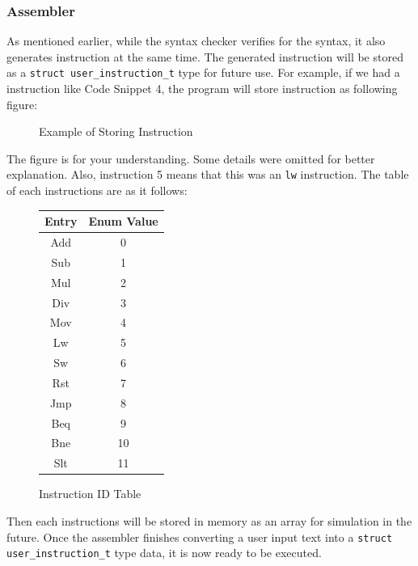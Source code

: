 \documentclass{homework}
\begin{document}
\subsubsection{Assembler}
As mentioned earlier, while the syntax checker verifies for the syntax, it also generates instruction at the same time. The generated instruction will be stored as a \texttt{struct user_instruction_t} type for future use. For example, if we had a instruction like Code Snippet 4, the program will store instruction as following figure:

\begin{figure}[h]
  \centering
  
  \caption{Example of Storing Instruction}
\end{figure}

The figure is for your understanding. Some details were omitted for better explanation. Also, instruction 5 means that this was an \texttt{lw} instruction. The table of each instructions are as it follows:

\begin{figure}[h]
\centering
\begin{tabular}{ |c|c| }
  \hline
  Entry & Enum Value \\
  \hline
  Add & 0 \\
  Sub & 1 \\
  Mul & 2 \\
  Div & 3 \\
  Mov & 4 \\
  Lw & 5 \\
  Sw & 6 \\
  Rst & 7 \\
  Jmp & 8 \\
  Beq & 9 \\
  Bne & 10 \\
  Slt & 11 \\
  \hline
\end{tabular}
  \caption{Instruction ID Table}
\end{figure}

Then each instructions will be stored in memory as an array for simulation in the future. Once the assembler finishes converting a user input text into a \texttt{struct user_instruction_t} type data, it is now ready to be executed.
\end{document}
